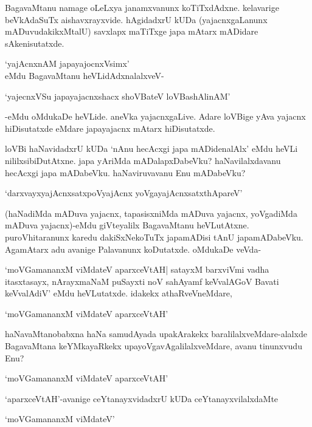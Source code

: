 BagavaMtanu namage oLeLxya janamxvanunx koTiTxdAdxne. kelavarige beVkAdaSuTx aishavxrayxvide. hAgidadxrU kUDa (yajacnxgaLanunx mADuvudakikxMtalU) savxlapx maTiTxge japa mAtarx mADidare sAkenisutatxde.

\begin{shloka}
`yajAcnxnAM japayajocnxV\s simx'\\
eMdu BagavaMtanu heVLidAdxnalalxveV-
\end{shloka}

\begin{shloka}
`yajecnxVSu japayajacnxshacx shoVBateV loVBashAlinAM'
\end{shloka}

-eMdu oMdukaDe heVLide. aneVka yajacnxgaLive. Adare loVBige yAva yajacnx hiDisutatxde eMdare japayajacnx mAtarx hiDisutatxde.

loVBi haNavidadxrU kUDa `nAnu hecAcxgi japa mADidenalAlx' eMdu heVLi nililxsibiDutAtxne. japa yAriMda mADalapxDabeVku? haNavilalxdavanu hecAcxgi japa mADabeVku. haNaviruvavanu Enu mADabeVku?

\begin{shloka}
`darxvayxyajAcnxsatxpoVyajAcnx yoVgayajAcnxsatxthApareV'
\end{shloka}

(haNadiMda mADuva yajacnx, tapasisxniMda mADuva yajacnx, yoVgadiMda mADuva yajacnx)-eMdu giVteyalilx BagavaMtanu heVLutAtxne. puroVhitaranunx karedu dakiSxNekoTuTx japamADisi tAnU japamADabeVku. AgamAtarx adu avanige Palavanunx koDutatxde. oMdukaDe veVda-

`moVGamananxM viMdateV aparxceVtAH| satayxM barxviVmi vadha itasxtasayx, nArayxmaNaM puSayxti noV sahAyamf keVvalAGoV Bavati keVvalAdiV' eMdu heVLutatxde. idakekx athaRveVneMdare,

\begin{shloka}
`moVGamananxM viMdateV aparxceVtAH'
\end{shloka}

haNavaMtanobabxna haNa samudAyada upakArakekx baralilalxveMdare-alalxde BagavaMtana keYMkayaRkekx upayoVgavAgalilalxveMdare, avanu tinunxvudu Enu?

\begin{shloka}
`moVGamananxM viMdateV aparxceVtAH'
\end{shloka}

`aparxceVtAH'-avanige ceYtanayxvidadxrU kUDa ceYtanayxvilalxdaMte 

\begin{shloka}
`moVGamananxM viMdateV'
\end{shloka}

